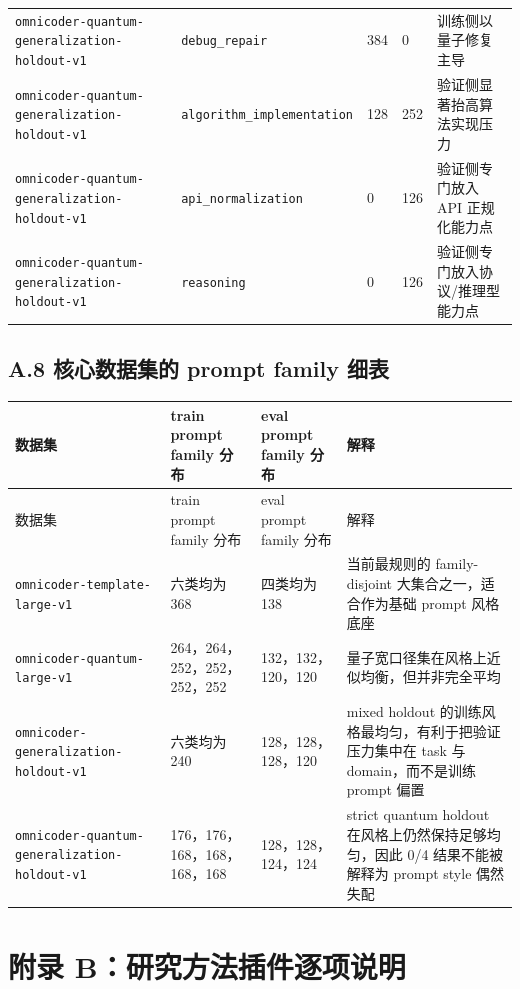 \documentclass[11pt,a4paper]{article}
\newcommand{\code}[1]{\begingroup\ttfamily\footnotesize\nolinkurl{#1}\endgroup}
\begin{document}
\begin{longtable}{T{2.9cm} T{3.3cm} p{1.3cm} p{1.3cm} p{4.9cm}}
\code{omnicoder-quantum-generalization-holdout-v1} & \code{debug\_repair} & 384 & 0 & 训练侧以量子修复主导 \\
\code{omnicoder-quantum-generalization-holdout-v1} & \code{algorithm\_implementation} & 128 & 252 & 验证侧显著抬高算法实现压力 \\
\code{omnicoder-quantum-generalization-holdout-v1} & \code{api\_normalization} & 0 & 126 & 验证侧专门放入 API 正规化能力点 \\
\code{omnicoder-quantum-generalization-holdout-v1} & \code{reasoning} & 0 & 126 & 验证侧专门放入协议/推理型能力点 \\
\bottomrule
\end{longtable}
\normalsize

\subsection{A.8 核心数据集的 prompt family 细表}

\small
\begin{longtable}{T{3.1cm} p{2.9cm} p{2.5cm} p{4.8cm}}
\toprule
数据集 & train prompt family 分布 & eval prompt family 分布 & 解释 \\
\midrule
\endfirsthead
\toprule
数据集 & train prompt family 分布 & eval prompt family 分布 & 解释 \\
\midrule
\endhead
\code{omnicoder-template-large-v1} & 六类均为 368 & 四类均为 138 & 当前最规则的 family-disjoint 大集合之一，适合作为基础 prompt 风格底座 \\
\code{omnicoder-quantum-large-v1} & 264，264，252，252，252，252 & 132，132，120，120 & 量子宽口径集在风格上近似均衡，但并非完全平均 \\
\code{omnicoder-generalization-holdout-v1} & 六类均为 240 & 128，128，128，120 & mixed holdout 的训练风格最均匀，有利于把验证压力集中在 task 与 domain，而不是训练 prompt 偏置 \\
\code{omnicoder-quantum-generalization-holdout-v1} & 176，176，168，168，168，168 & 128，128，124，124 & strict quantum holdout 在风格上仍然保持足够均匀，因此 0/4 结果不能被解释为 prompt style 偶然失配 \\
\bottomrule
\end{longtable}
\normalsize

\clearpage

\section{附录 B：研究方法插件逐项说明}
\end{document}
